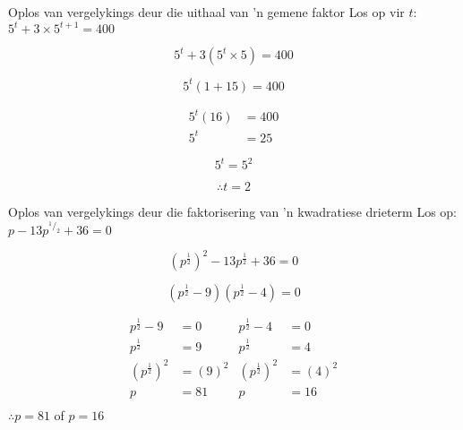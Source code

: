 \begin{wex}
{%
Oplos van vergelykings deur die uithaal van 'n gemene faktor
}
{%
Los op vir $t$: $5^t + 3 \times 5^{t+1} = 400$}
{%

\begin{equation*}
  5^t + 3 ( 5^t \times 5) = 400 
\end{equation*}

\begin{equation*}
 5^t(1 + 15) = 400 
\end{equation*}


\begin{align*}
 5^t(16) &= 400 \\
  5^t &= 25 
\end{align*}



\begin{equation*}
  5^t = 5^2 
\end{equation*}


\begin{equation*}
\therefore t = 2
\end{equation*}

}
\end{wex}

\begin{wex}
{Oplos van vergelykings deur die faktorisering van 'n kwadratiese drieterm}
{Los op: $ p-13 p^{^1/_2} + 36 =  0$}
{ %


$$ (p^{\frac{1}{2}})^2 -13p^{\frac{1}{2}} + 36 = 0 $$


$$ (p^{\frac{1}{2}} -9)(p^{\frac{1}{2}}-4) = 0 $$


\begin{align*}
p^{\frac{1}{2}} - 9 &= 0			&   p^{\frac{1}{2}} - 4 &= 0		\\
p^{\frac{1}{2}} &= 9				&   p^{\frac{1}{2}} &= 4		\\		
(p^{\frac{1}{2}})^2 &= (9)^2			&   (p^{\frac{1}{2}})^2 &= (4)^2\\
p &= 81				&   p &= 16\\
\end{align*} 
$\therefore p=81$ of $p=16$
}
\end{wex}

